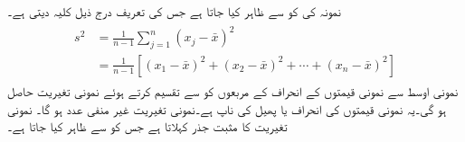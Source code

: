 نمونہ  کی  کو  سے ظاہر کیا جاتا ہے جس کی تعریف درج ذیل کلیہ دیتی ہے۔
\begin{gather}
\begin{aligned}\label{مساوات_شماریات_نمونی_اوسط_ب}
s^2&=\frac{1}{n-1}\sum_{j=1}^{n}(x_j-\bar{x})^2\\
&=\frac{1}{n-1}[(x_1-\bar{x})^2+(x_2-\bar{x})^2+\cdots +(x_n-\bar{x})^2]
\end{aligned}
\end{gather}
نمونی اوسط  سے نمونی قیمتوں کے انحراف کے مربعوں کو  سے تقسیم کرتے ہوئے نمونی تغیریت حاصل ہو گی۔یہ نمونی قیمتوں کی انحراف یا پھیل کی ناپ ہے۔نمونی تغیریت غیر منفی عدد ہو گا۔ نمونی تغیریت  کا مثبت جذر  کہلاتا ہے جس کو  سے ظاہر کیا جاتا ہے۔

